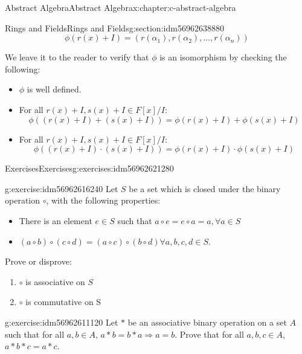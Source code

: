 \documentclass[twoside,10pt,]{book}
\numberwithin{equation}{section}
\begin{document}
\begin{chapterptx}{Abstract Algebra}{}{Abstract Algebra}{}{}{x:chapter:c-abstract-algebra}
\begin{sectionptx}{Rings and Fields}{}{Rings and Fields}{}{}{g:section:idm56962638880}
\begin{equation*}
\phi(r(x)+I)=(r(\alpha_1),r(\alpha_2),\dots,r(\alpha_n))
\end{equation*}
%
\par
We leave it to the reader to verify that \(\phi\) is an isomorphism by checking the following:%
\begin{itemize}[label=\textbullet]
\item{}\(\phi\) is well defined.%
\item{}For all \(r(x)+I, s(x)+I  \in F[x]/I\):%
\begin{equation*}
\phi((r(x)+I)+(s(x)+I))= \phi(r(x)+I)+\phi(s(x)+I)
\end{equation*}
%
\item{}For all \(r(x)+I, s(x)+I  \in F[x]/I\):%
\begin{equation*}
\phi((r(x)+I)\cdot (s(x)+I))= \phi(r(x)+I)\cdot \phi(s(x)+I)
\end{equation*}
%
\end{itemize}
%
\end{sectionptx}
%
%
\typeout{************************************************}
\typeout{************************************************}
%
\begin{exercises-section}{Exercises}{}{Exercises}{}{}{g:exercises:idm56962621280}
\begin{divisionexercise}{1}{}{}{g:exercise:idm56962616240}%
Let \(S\) be a set which is closed under the binary operation \(\circ\), with the following properties:%
\begin{itemize}[label=\textbullet]
\item{}There is an element \(e \in S\) such that \(a \circ e = e\circ a=a, \forall a\in S\)%
\item{}\((a \circ b) \circ (c \circ d) = (a \circ c) \circ (b \circ d) \forall a,b,c,d \in  S\).%
\end{itemize}
%
\par
Prove or disprove:%
\begin{enumerate}[label=(\alph*)]
\item{}\(\circ\)  is associative on \(S\)%
\item{}\(\circ\)  is commutative on S%
\end{enumerate}
%
\end{divisionexercise}%
\begin{divisionexercise}{2}{}{}{g:exercise:idm56962611120}%
Let \(*\) be an associative binary operation on a set \(A\) such that for all \(a, b \in A\), \(a*b=b*a \Rightarrow a=b\).  Prove that for all \(a, b, c \in A\), \(a*b*c = a*c\).%

\end{divisionexercise}
\end{exercises-section}
\end{chapterptx}
\end{document}
